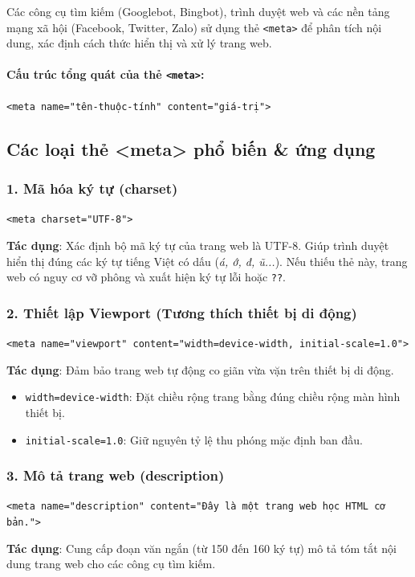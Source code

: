 \documentclass[11pt,oneside]{book}
\newcommand{\codeinline}[1]{\textcolor{accentOrange}{\texttt{#1}}}
\begin{document}
Các công cụ tìm kiếm (Googlebot, Bingbot), trình duyệt web và các nền tảng mạng xã hội (Facebook, Twitter, Zalo) sử dụng thẻ \codeinline{<meta>} để phân tích nội dung, xác định cách thức hiển thị và xử lý trang web.

\paragraph{Cấu trúc tổng quát của thẻ \codeinline{<meta>}:}
\begin{center}
\codeinline{<meta name="tên-thuộc-tính" content="giá-trị">}
\end{center}

\subsection{Các loại thẻ <meta> phổ biến \& ứng dụng}

\subsubsection{1. Mã hóa ký tự (charset)}
\begin{center}
\codeinline{<meta charset="UTF-8">}
\end{center}
\textbf{Tác dụng}: Xác định bộ mã ký tự của trang web là UTF-8. Giúp trình duyệt hiển thị đúng các ký tự tiếng Việt có dấu (\textit{á, ớ, đ, ũ...}). Nếu thiếu thẻ này, trang web có nguy cơ vỡ phông và xuất hiện ký tự lỗi \texttt{} hoặc \texttt{??}.

\subsubsection{2. Thiết lập Viewport (Tương thích thiết bị di động)}
\begin{center}
\codeinline{<meta name="viewport" content="width=device-width, initial-scale=1.0">}
\end{center}
\textbf{Tác dụng}: Đảm bảo trang web tự động co giãn vừa vặn trên thiết bị di động.
\begin{itemize}[leftmargin=1.8em, itemsep=2pt, parsep=0pt]
    \item \codeinline{width=device-width}: Đặt chiều rộng trang bằng đúng chiều rộng màn hình thiết bị.
    \item \codeinline{initial-scale=1.0}: Giữ nguyên tỷ lệ thu phóng mặc định ban đầu.
\end{itemize}

\subsubsection{3. Mô tả trang web (description)}
\begin{center}
\codeinline{<meta name="description" content="Đây là một trang web học HTML cơ bản.">}
\end{center}
\textbf{Tác dụng}: Cung cấp đoạn văn ngắn (từ 150 đến 160 ký tự) mô tả tóm tắt nội dung trang web cho các công cụ tìm kiếm.
\end{document}
